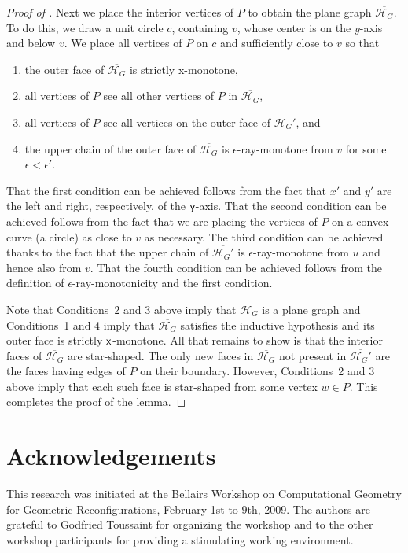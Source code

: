 \documentclass[lotsofwhite,charterfonts, letter]{patmorin}
\newcommand{\x}{\ensuremath{\protect\textup{\textsf{x}}}}
\newcommand{\y}{\ensuremath{\protect\textup{\textsf{y}}}}
\newcommand{\hg}{\ensuremath{\mathcal{H}_G}}
\begin{document}
\begin{proof}[Proof of ]
Next we place the interior vertices of $P$ to obtain the plane graph
$\overline{\hg}$.
To do this, we draw a unit circle $c$, containing
$v$, whose center is on the $y$-axis and below $v$.  We place all
vertices of $P$ on $c$ and sufficiently close to $v$ so that
\begin{enumerate}
\item the outer face of $\overline{\hg}$ is strictly x-monotone,
\item all vertices of $P$ see all other vertices of $P$ in $\overline{\hg}$,
\item all vertices of $P$ see all vertices on the outer face of
$\overline{\hg'}$, and
\item the upper chain of the outer face of $\overline{\hg}$ is $\epsilon$-ray-monotone from $v$ for some
$\epsilon<\epsilon'$.
\end{enumerate}
That the first condition can be achieved follows from the fact that
$x'$ and $y'$ are the left and right, respectively, of the \y-axis.
That the second condition can be achieved follows from the fact that
we are placing the vertices of $P$ on a convex curve (a circle) as
close to $v$ as necessary.  The third condition can be achieved thanks
to the fact that the upper chain of $\overline{\hg'}$ is
$\epsilon$-ray-monotone from $u$ and hence also from $v$.  That the
fourth condition can be achieved follows from the 
definition of $\epsilon$-ray-monotonicity and the first condition.

Note that Conditions~2 and 3 above imply that $\overline{\hg}$ is a
plane graph and Conditions~1 and 4 imply that $\overline{\hg}$
satisfies the inductive hypothesis and its outer face is strictly
\x-monotone.  All that remains to show is that the interior faces of
$\overline{\hg}$ are star-shaped.  The only new faces in $\overline{\hg}$
not present in $\overline{\hg'}$ are the faces having edges of $P$ on
their boundary.  However, Conditions~2 and 3 above imply that each
such face is star-shaped from some vertex $w\in P$.  This completes
the proof of the lemma.
\end{proof}







\section*{Acknowledgements}

This research was initiated at the Bellairs Workshop on Computational
Geometry for Geometric Reconfigurations, February 1st to 9th, 2009.  The
authors are grateful to Godfried Toussaint for organizing the workshop
and to the other workshop participants for providing a stimulating
working environment.

%


\end{document}
